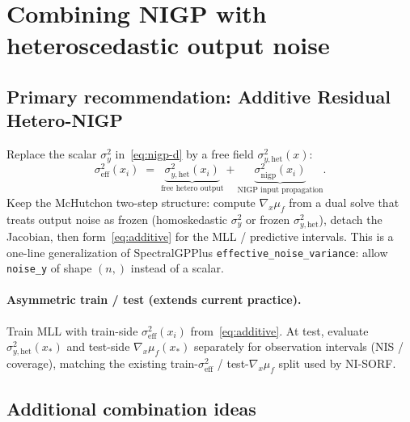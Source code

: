 \documentclass[11pt]{article}
\newcommand{\sigy}{\sigma_{y}^{2}}%
\newcommand{\sighet}{\sigma_{y,\mathrm{het}}^{2}}%
\newcommand{\signigp}{\sigma_{\mathrm{nigp}}^{2}}%
\newcommand{\sigeff}{\sigma_{\mathrm{eff}}^{2}}%
\newcommand{\gradmuf}{\nabla_{x}\mu_{f}}%
\begin{document}
\section{Combining NIGP with heteroscedastic output noise}

\subsection{Primary recommendation: Additive Residual Hetero-NIGP}
\label{sec:additive}

Replace the scalar $\sigy$ in~\eqref{eq:nigp-d} by a free field $\sighet(x)$:
\begin{equation}
\label{eq:additive}
  \sigeff(x_i)
  \;=\;
  \underbrace{\sighet(x_i)}_{\text{free hetero output}}
  +
  \underbrace{\signigp(x_i)}_{\text{NIGP input propagation}}.
\end{equation}
Keep the McHutchon two-step structure: compute $\gradmuf$ from a dual solve that
treats output noise as frozen (homoskedastic $\sigy$ or frozen $\sighet$), detach the Jacobian,
then form~\eqref{eq:additive} for the MLL / predictive intervals.
This is a one-line generalization of SpectralGPPlus
\texttt{effective\_noise\_variance}: allow \texttt{noise\_y} of shape $(n,)$ instead of a scalar.

\paragraph{Asymmetric train / test (extends current practice).}
Train MLL with train-side $\sigeff(x_i)$ from~\eqref{eq:additive}.
At test, evaluate $\sighet(x_*)$ and test-side $\gradmuf(x_*)$ separately for observation
intervals (NIS / coverage), matching the existing train-$\sigeff$ / test-$\gradmuf$ split used by NI-SORF.

\subsection{Additional combination ideas}
\label{sec:ideas}
\end{document}

